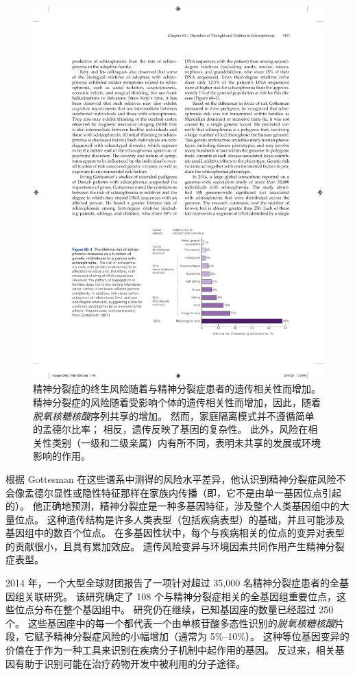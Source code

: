 \begin{figure}[htbp]
	\centering
	\includegraphics[width=0.7\linewidth]{chap60/fig_60_1}
	\caption{精神分裂症的终生风险随着与精神分裂症患者的遗传相关性而增加。
		精神分裂症的风险随着受影响个体的遗传相关性而增加，因此，随着\textit{脱氧核糖核酸}序列共享的增加。
		然而，家庭隔离模式并不遵循简单的孟德尔比率；
		相反，遗传反映了基因的复杂性。
		此外，风险在相关性类别（一级和二级亲属）内有所不同，表明未共享的发展或环境影响的作用\cite{gottesman1991schizophrenia}。}
	\label{fig:60_1}
\end{figure}


根据 Gottesman 在这些谱系中测得的风险水平差异，他认识到精神分裂症风险不会像孟德尔显性或隐性特征那样在家族内传播（即，它不是由单一基因位点引起的）。
他正确地预测，精神分裂症是一种多基因特征，涉及整个人类基因组中的大量位点。
这种遗传结构是许多人类表型（包括疾病表型）的基础，并且可能涉及基因组中的数百个位点。
在多基因性状中，每个与疾病相关的位点的变异对表型的贡献很小，且具有累加效应。
遗传风险变异与环境因素共同作用产生精神分裂症表型。


2014 年，一个大型全球财团报告了一项针对超过 35,000 名精神分裂症患者的全基因组关联研究。
该研究确定了 108 个与精神分裂症相关的全基因组重要位点，这些位点分布在整个基因组中。
研究仍在继续，已知基因座的数量已经超过 250 个。
这些基因座中的每一个都代表一个由单核苷酸多态性识别的\textit{脱氧核糖核酸}片段，它赋予精神分裂症风险的小幅增加（通常为 5\%–10\%）。
这种等位基因变异的价值在于作为一种工具来识别在疾病分子机制中起作用的基因。
反过来，相关基因有助于识别可能在治疗药物开发中被利用的分子途径。



